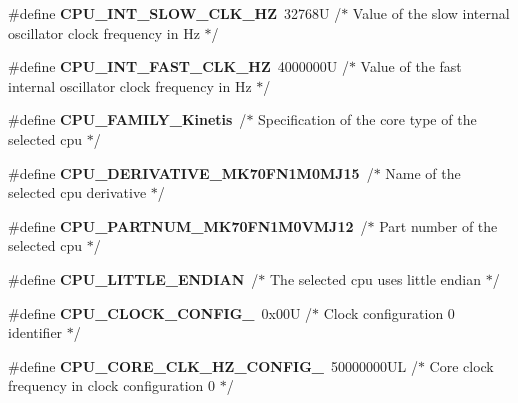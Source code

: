 \begin{DoxyCompactItemize}
\item 
\hypertarget{group___cpu__module_ga925e4835a9fdb52f03bd354d62d6ba0a}{}\#define {\bfseries C\+P\+U\+\_\+\+I\+N\+T\+\_\+\+S\+L\+O\+W\+\_\+\+C\+L\+K\+\_\+\+H\+Z}~32768\+U /$\ast$ Value of the slow internal oscillator clock frequency in Hz  $\ast$/\label{group___cpu__module_ga925e4835a9fdb52f03bd354d62d6ba0a}

\item 
\hypertarget{group___cpu__module_ga741ad9275688de8051f4bebd98a682bc}{}\#define {\bfseries C\+P\+U\+\_\+\+I\+N\+T\+\_\+\+F\+A\+S\+T\+\_\+\+C\+L\+K\+\_\+\+H\+Z}~4000000\+U /$\ast$ Value of the fast internal oscillator clock frequency in Hz  $\ast$/\label{group___cpu__module_ga741ad9275688de8051f4bebd98a682bc}

\item 
\hypertarget{group___cpu__module_ga5bf3022570d9bb7a0d666f2dd9db6a34}{}\#define {\bfseries C\+P\+U\+\_\+\+F\+A\+M\+I\+L\+Y\+\_\+\+Kinetis}~/$\ast$ Specification of the core type of the selected cpu $\ast$/\label{group___cpu__module_ga5bf3022570d9bb7a0d666f2dd9db6a34}

\item 
\hypertarget{group___cpu__module_gacd513a4c0c142604e0fa3fbaf5f92e42}{}\#define {\bfseries C\+P\+U\+\_\+\+D\+E\+R\+I\+V\+A\+T\+I\+V\+E\+\_\+\+M\+K70\+F\+N1\+M0\+M\+J15}~/$\ast$ Name of the selected cpu derivative $\ast$/\label{group___cpu__module_gacd513a4c0c142604e0fa3fbaf5f92e42}

\item 
\hypertarget{group___cpu__module_ga4fcc1df1d7918b17e6f8af2228b9a1c4}{}\#define {\bfseries C\+P\+U\+\_\+\+P\+A\+R\+T\+N\+U\+M\+\_\+\+M\+K70\+F\+N1\+M0\+V\+M\+J12}~/$\ast$ Part number of the selected cpu $\ast$/\label{group___cpu__module_ga4fcc1df1d7918b17e6f8af2228b9a1c4}

\item 
\hypertarget{group___cpu__module_gab62ca27d0a6a531f35842a6e3a94b454}{}\#define {\bfseries C\+P\+U\+\_\+\+L\+I\+T\+T\+L\+E\+\_\+\+E\+N\+D\+I\+A\+N}~/$\ast$ The selected cpu uses little endian $\ast$/\label{group___cpu__module_gab62ca27d0a6a531f35842a6e3a94b454}

\item 
\hypertarget{group___cpu__module_ga4d7ade6a1c335a7e5233938aa9197157}{}\#define {\bfseries C\+P\+U\+\_\+\+C\+L\+O\+C\+K\+\_\+\+C\+O\+N\+F\+I\+G\+\_}~0x00\+U /$\ast$ Clock configuration 0 identifier $\ast$/\label{group___cpu__module_ga4d7ade6a1c335a7e5233938aa9197157}

\item 
\hypertarget{group___cpu__module_ga6fe0b841d40421ee48af4a4e01e48ddf}{}\#define {\bfseries C\+P\+U\+\_\+\+C\+O\+R\+E\+\_\+\+C\+L\+K\+\_\+\+H\+Z\+\_\+\+C\+O\+N\+F\+I\+G\+\_}~50000000\+U\+L /$\ast$ Core clock frequency in clock configuration 0 $\ast$/\label{group___cpu__module_ga6fe0b841d40421ee48af4a4e01e48ddf}


\end{DoxyCompactItemize}
